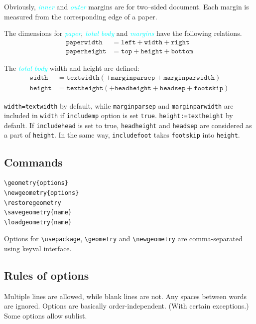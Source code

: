 \documentclass[a4paper,oneside]{book}
\newcommand{\coloritsf}[1]{\textcolor{cyan}{\sffamily\itshape #1}}
\begin{document}
Obviously, \coloritsf{inner} and \coloritsf{outer} margins are for two--sided document. Each margin is measured from the corresponding edge of a paper.

The dimensions for \coloritsf{paper}, \coloritsf{total body} and \coloritsf{margins} have the following relations.
\begin{align}
  \texttt{paperwidth}&=\texttt{left}+\texttt{width}+\texttt{right}\\
  \texttt{paperheight}&=\texttt{top}+\texttt{height}+\texttt{bottom}
\end{align}

The \coloritsf{total body} width and height are defined:
\begin{align}
  \texttt{width}&=\texttt{textwidth}(+\texttt{marginparsep}+\texttt{marginparwidth})\\
  \texttt{height}&=\texttt{textheight}(+\texttt{headheight}+\texttt{headsep}+\texttt{footskip})
\end{align}

\texttt{width=textwidth} by default, while \texttt{marginparsep} and \texttt{marginparwidth} are included in \texttt{width} if \texttt{includemp} option is set \texttt{true}. \texttt{height:=textheight} by default. If \texttt{includehead} is set to true, \texttt{headheight} and \texttt{headsep} are considered as a part of \texttt{height}. In the same way, \texttt{includefoot} takes \texttt{footskip} into \texttt{height}.

\subsection{Commands}

\begin{verbatim}
\geometry{options}
\newgeometry{options}
\restoregeometry
\savegeometry{name}
\loadgeometry{name}
\end{verbatim}

Options for \verb|\usepackage|, \verb|\geometry| and \verb|\newgeometry| are comma-separated using \textsf{keyval} interface.

\subsection{Rules of options}

Multiple lines are allowed, while blank lines are not.
Any spaces between words are ignored.
Options are basically order-independent. (With certain exceptions.)
Some options allow sublist.
\end{document}
